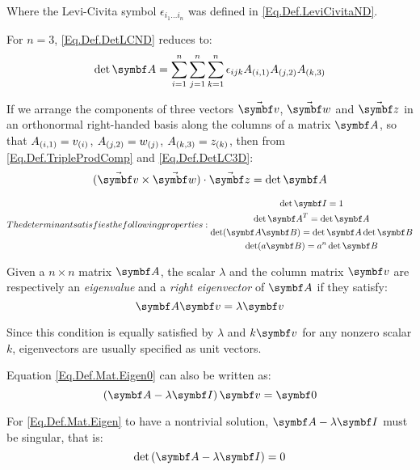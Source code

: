 Where the Levi-Civita symbol $\epsilon_{i_1 \dots i_n}$ was defined in \eqref{Eq.Def.LeviCivitaND}.

For $n=3$, \eqref{Eq.Def.DetLCND} reduces to:
\begin{equation} \label{Eq.Def.DetLC3D}
\det\mat{A} = \sum_{i=1}^{n}\sum_{j=1}^{n}\sum_{k=1}^{n} \epsilon_{ijk} \ind{A}{i,1} \ind{A}{j,2}\ind{A}{k,3}
\end{equation}

If we arrange the components of three vectors $\vabs{v}$, $\vabs{w}$ and $\vabs{z}$ in an orthonormal right-handed basis along the columns of a matrix $\mat{A}$, so that $A_{(i,1)}=v_{(i)}$, $A_{(j,2)}=w_{(j)}$, $A_{(k,3)}=z_{(k)}$, then from \eqref{Eq.Def.TripleProdComp} and \eqref{Eq.Def.DetLC3D}:
\begin{equation} \label{Eq.Res.TripleProdDet1}
(\vabs{v} \times \vabs{w})\cdot\vabs{z} = \det \mat{A}
\end{equation}

\begin{subequations}
The determinant satisfies the following properties:
\begin{gather}
\det \IdM = 1 \label{Eq.Res.DetId}\\
\det \tr{\mat{A}} = \det \mat{A} \label{Eq.Res.DetTransp}\\
\det(\mat{A}\mat{B})=\det\mat{A}\det\mat{B} \label{Eq.Res.DetProd}\\
\det(a\mat{B})=a^{n}\det \mat{B} \label{Eq.Res.DetScalar}
\end{gather}
\end{subequations}

Given a $n \times n$ matrix $\mat{A}$, the scalar $\lambda$ and the column matrix $\mcol{v}$ are respectively an \emph{eigenvalue} and a \emph{right eigenvector} of $\mat{A}$ if they satisfy:
\begin{equation} \label{Eq.Def.Mat.Eigen0}
\mat{A} \mcol{v} = \lambda \mcol{v}
\end{equation}

Since this condition is equally satisfied by $\lambda$ and $k\mcol{v}$ for any nonzero scalar $k$, eigenvectors are usually specified as unit vectors.

Equation \eqref{Eq.Def.Mat.Eigen0} can also be written as:
\begin{equation} \label{Eq.Def.Mat.Eigen}
\rndp{\mat{A} - \lambda \IdM} \mcol{v} = \NullM
\end{equation}

For \eqref{Eq.Def.Mat.Eigen} to have a nontrivial solution, $\mat{A} - \lambda \IdM$ must be singular, that is:
\begin{equation} \label{Eq.Def.Mat.CharEq}
\det \rndp{\mat{A} - \lambda \IdM} = 0
\end{equation}

